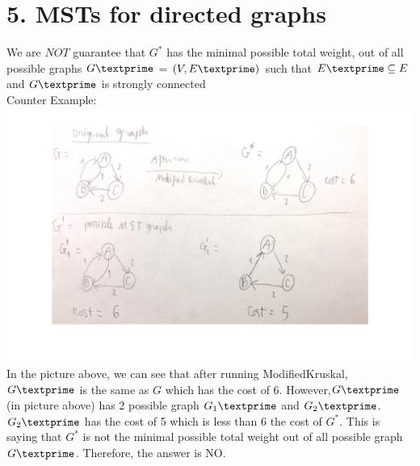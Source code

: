 \documentclass[11pt]{article}
\begin{document}
\newpage
\section*{5. MSTs for directed graphs}
We are $\boxed{NOT}$ guarantee that $G^*$ has the minimal possible total weight, out of all possible graphs $G\textprime$ = $(V,E\textprime)$ such that $E\textprime \subseteq E$ and $G\textprime$ is strongly connected\\
Counter Example:\\
\includegraphics[scale=0.3]{p5.png}\\
In the picture above, we can see that after running ModifiedKruskal, $G\textprime$ is the same as $G$ which has the cost of 6. However,$G\textprime$ (in picture above) has 2 possible graph $G_1\textprime$ and $G_2\textprime$. $G_2\textprime$ has the cost of 5 which is less than 6 the cost  of $G^*$. This is saying that $G^*$ is not the minimal possible total weight out of all possible graph $G\textprime$. Therefore, the answer is NO.



\end{document}
